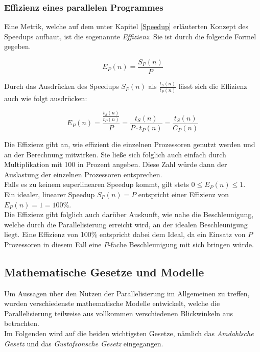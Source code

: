 			\subsubsection{Effizienz eines parallelen Programmes}
			
				Eine Metrik, welche auf dem unter Kapitel \ref{Speedup} erläuterten Konzept des Speedups aufbaut, ist die sogenannte \textit{Effizienz}. Sie ist durch die folgende Formel gegeben.
				
				\[ E_P(n) = \frac{S_P(n)}{P} \]
				
				Durch das Ausdrücken des Speedups $S_P(n)$ als \( \frac{t_S(n)}{t_P(n)} \) lässt sich die Effizienz auch wie folgt ausdrücken:
				
				\[ E_P(n) = \frac{\frac{t_S(n)}{t_P(n)}}{P} = \frac{t_S(n)}{P \cdot t_P(n)} = \frac{t_S(n)}{C_P(n)} \]
				
				Die Effizienz gibt an, wie effizient die einzelnen Prozessoren genutzt werden und an der Berechnung mitwirken. Sie ließe sich folglich auch einfach durch Multiplikation mit 100 in Prozent angeben. Diese Zahl würde dann der Auslastung der einzelnen Prozessoren entsprechen.\\
				Falls es zu keinem superlinearen Speedup kommt, gilt stets \( 0 \leq E_P(n) \leq 1 \).\\
				Ein idealer, linearer Speedup $S_P(n) = P$ entspricht einer Effizienz von $E_P(n) = 1 = 100\%$.\\
				Die Effizienz gibt folglich auch darüber Auskunft, wie nahe die Beschleunigung, welche durch die Parallelisierung erreicht wird, an der idealen Beschleunigung liegt. Eine Effizienz von 100\% entspricht dabei dem Ideal, da ein Einsatz von $P$ Prozessoren in diesem Fall eine $P$-fache Beschleunigung mit sich bringen würde. \cite{ParaProgRauber}
			
		\subsection{Mathematische Gesetze und Modelle}
			
			Um Aussagen über den Nutzen der Parallelisierung im Allgemeinen zu treffen, wurden verschiedenste mathematische Modelle entwickelt, welche die Parallelisierung teilweise aus vollkommen verschiedenen Blickwinkeln aus betrachten.\\
			Im Folgenden wird auf die beiden wichtigsten Gesetze, nämlich das \textit{Amdahlsche Gesetz} und das \textit{Gustafsonsche Gesetz} eingegangen.
			
